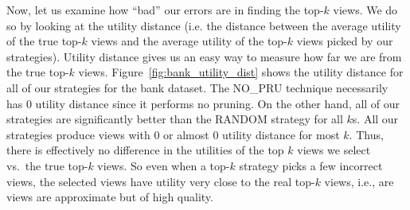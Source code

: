 Now, let us examine how ``bad'' our errors are in finding the top-$k$ views.
We do so by looking at the utility distance (i.e. the distance between
the average utility of the true top-$k$ views and the average utility of the
top-$k$ views picked by our strategies).
Utility distance gives us an easy way to measure how far we are from the true
top-$k$ views.
Figure~\ref{fig:bank_utility_dist} shows the utility distance for
all of our strategies for the bank dataset.
The NO\_PRU technique necessarily has 0 utility distance since
it performs no pruning.
On the other hand, all of our strategies are significantly better than the RANDOM
strategy for all $k$s.
All our strategies produce views with 0 or almost 0 utility distance for most $k$. 
Thus, there is effectively no difference in the utilities of the top $k$ views
we select vs.~the true top-$k$ views.
So even when a top-$k$ strategy picks a few incorrect views, the selected views
have utility very close to the real top-$k$ views, i.e., are views are
approximate but of high quality.

